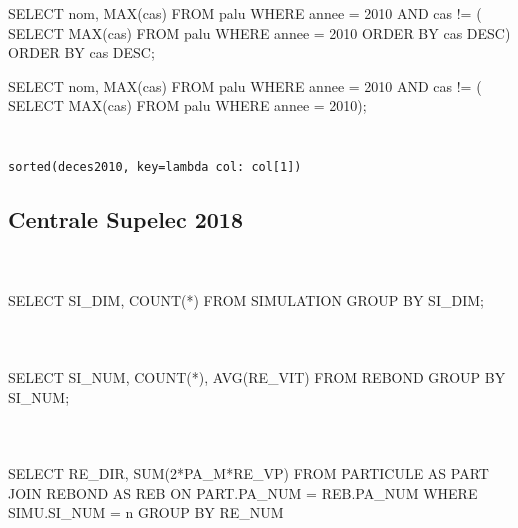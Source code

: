 \documentclass[10pt,fleqn]{article} %
\begin{document}
\begin{multicols}{2}
\begin{sql}
SELECT nom, MAX(cas)
	FROM palu
	WHERE annee = 2010 AND cas != (
			SELECT MAX(cas)
			FROM palu
			WHERE annee = 2010
			ORDER BY cas DESC)
	ORDER BY cas DESC;
\end{sql}

\begin{sql}
SELECT nom, MAX(cas)
	FROM palu
	WHERE annee = 2010 AND cas != (
			SELECT MAX(cas)
			FROM palu
			WHERE annee = 2010);
\end{sql}


\subparagraph{}~\\

\texttt{sorted(deces2010, key=lambda col: col[1])}


\subsection*{Centrale Supelec 2018}
\setcounter{exo}{0}
\subparagraph{}~\\
\begin{sql}
SELECT SI_DIM, COUNT(*)
	FROM SIMULATION
	GROUP BY SI_DIM;
\end{sql}

\subparagraph{}~\\
\begin{sql}
SELECT SI_NUM, COUNT(*), AVG(RE_VIT)
	FROM REBOND
	GROUP BY SI_NUM;
\end{sql}


\subparagraph{}~\\

\begin{sql}
SELECT  RE_DIR,  SUM(2*PA_M*RE_VP)
	FROM PARTICULE AS PART
	JOIN REBOND AS REB
	ON PART.PA_NUM =  REB.PA_NUM
	WHERE SIMU.SI_NUM = n
	GROUP BY RE_NUM
\end{sql}



\end{multicols}
\end{document}

